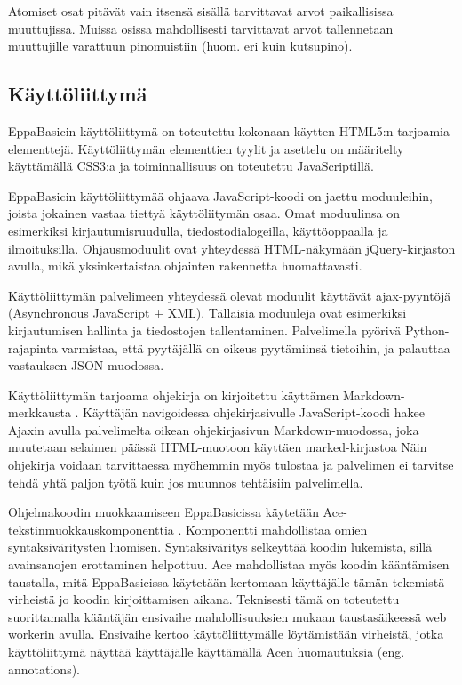 Atomiset osat pitävät vain
itsensä sisällä tarvittavat
arvot paikallisissa muuttujissa.
Muissa osissa mahdollisesti tarvittavat
arvot tallennetaan muuttujille
varattuun pinomuistiin
(huom. eri kuin kutsupino).


\subsection{Käyttöliittymä}
EppaBasicin käyttöliittymä on toteutettu
kokonaan käytten HTML5:n tarjoamia elementtejä.
Käyttöliittymän elementtien tyylit ja asettelu
on määritelty käyttämällä CSS3:a ja
toiminnallisuus on toteutettu
JavaScriptillä.

EppaBasicin käyttöliittymää ohjaava JavaScript-koodi
on jaettu moduuleihin, joista jokainen vastaa
tiettyä käyttöliitymän osaa.
Omat moduulinsa on esimerkiksi kirjautumisruudulla,
tiedostodialogeilla, käyttöoppaalla ja ilmoituksilla.
Ohjausmoduulit ovat yhteydessä HTML-näkymään
jQuery-kirjaston \cite{jquery} avulla,
mikä yksinkertaistaa ohjainten rakennetta huomattavasti.

Käyttöliittymän palvelimeen yhteydessä olevat
moduulit käyttävät ajax-pyyntöjä
(Asyn\-chro\-nous JavaScript + XML).
Tällaisia moduuleja ovat esimerkiksi
kirjautumisen hallinta ja tiedostojen tallentaminen.
Palvelimella pyörivä Python-rajapinta varmistaa,
että pyytäjällä on oikeus pyytämiinsä tietoihin,
ja palauttaa vastauksen JSON-muodossa.

Käyttöliittymän tarjoama ohjekirja on kirjoitettu
käyttämen Markdown-merkkausta \cite{markdown}.
Käyttäjän navigoidessa ohjekirjasivulle
JavaScript-koodi hakee Ajaxin avulla palvelimelta
oikean ohjekirjasivun Markdown-muodossa,
joka muutetaan selaimen päässä HTML-muotoon käyttäen
marked-kirjastoa \cite{marked}
Näin ohjekirja voidaan tarvittaessa myöhemmin
myös tulostaa ja palvelimen ei tarvitse tehdä
yhtä paljon työtä kuin jos
muunnos tehtäisiin palvelimella.

Ohjelmakoodin muokkaamiseen EppaBasicissa käytetään
Ace-teks\-tin\-muok\-kaus\-kom\-po\-nent\-tia \cite{ace_about}.
Komponentti mahdollistaa omien syntaksiväritysten luomisen.
Syntaksiväritys selkeyttää koodin lukemista,
sillä avainsanojen erottaminen helpottuu.
Ace mahdollistaa myös koodin kääntämisen taustalla,
mitä EppaBasicissa käytetään kertomaan käyttäjälle
tämän tekemistä virheistä jo koodin kirjoittamisen aikana.
Teknisesti tämä on toteutettu suorittamalla
kääntäjän ensivaihe mahdollisuuksien mukaan
taustasäikeessä web workerin \cite{w3c_web_worker} avulla.
Ensivaihe kertoo käyttöliittymälle löytämistään virheistä,
jotka käyttöliittymä näyttää käyttäjälle käyttämällä
Acen huomautuksia (eng. annotations).


